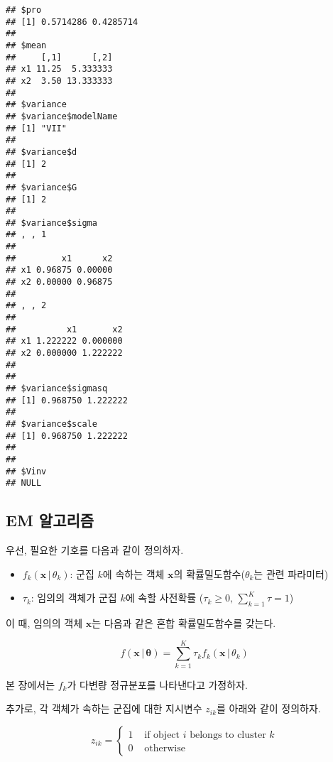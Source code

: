 \documentclass[
]{book}
\newenvironment{Shaded}{\begin{snugshade}}{\end{snugshade}}
\newcommand{\CommentTok}[1]{\textcolor[rgb]{0.56,0.35,0.01}{\textit{#1}}}
\newcommand{\NormalTok}[1]{#1}
\newcommand{\SpecialCharTok}[1]{\textcolor[rgb]{0.00,0.00,0.00}{#1}}
\providecommand{\tightlist}{%
  \setlength{\itemsep}{0pt}\setlength{\parskip}{0pt}}
\begin{document}
\begin{Shaded}
\end{Shaded}

\begin{verbatim}
## $pro
## [1] 0.5714286 0.4285714
## 
## $mean
##     [,1]      [,2]
## x1 11.25  5.333333
## x2  3.50 13.333333
## 
## $variance
## $variance$modelName
## [1] "VII"
## 
## $variance$d
## [1] 2
## 
## $variance$G
## [1] 2
## 
## $variance$sigma
## , , 1
## 
##         x1      x2
## x1 0.96875 0.00000
## x2 0.00000 0.96875
## 
## , , 2
## 
##          x1       x2
## x1 1.222222 0.000000
## x2 0.000000 1.222222
## 
## 
## $variance$sigmasq
## [1] 0.968750 1.222222
## 
## $variance$scale
## [1] 0.968750 1.222222
## 
## 
## $Vinv
## NULL
\end{verbatim}

\hypertarget{model-based-clustering-em}{%
\subsection{EM 알고리즘}\label{model-based-clustering-em}}

우선, 필요한 기호를 다음과 같이 정의하자.

\begin{itemize}
\tightlist
\item
  \(f_k(\mathbf{x} \, | \, \theta_k)\): 군집 \(k\)에 속하는 객체 \(\mathbf{x}\)의 확률밀도함수(\(\theta_k\)는 관련 파라미터)
\item
  \(\tau_k\): 임의의 객체가 군집 \(k\)에 속할 사전확률 (\(\tau_k \geq 0, \, \sum_{k = 1}^{K} \tau = 1\))
\end{itemize}

이 때, 임의의 객체 \(\mathbf{x}\)는 다음과 같은 혼합 확률밀도함수를 갖는다.

\begin{equation*}
f(\mathbf{x} \, | \, \boldsymbol\theta) = \sum_{k = 1}^{K} \tau_k f_k(\mathbf{x} \, | \, \theta_k)
\end{equation*}

본 장에서는 \(f_k\)가 다변량 정규분포를 나타낸다고 가정하자.

추가로, 각 객체가 속하는 군집에 대한 지시변수 \(z_{ik}\)를 아래와 같이 정의하자.

\begin{equation*}
z_{ik} = \begin{cases}
1 & \text{ if object $i$ belongs to cluster $k$} \\
0 & \text{ otherwise}
\end{cases}
\end{equation*}
\end{document}
